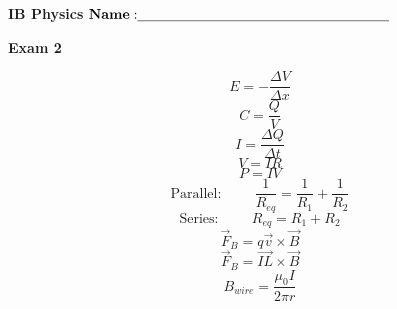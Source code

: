 \documentclass{article}
\begin{document}

\doublespacing
\textbf{IB Physics }                        %
 \hfill                             %
${\bf Name: } \underline{\hspace{2.5in}}$

\begin{centering}
\vspace{1cm}
\textbf{Exam 2}\\
\end{centering}

\vspace{1cm}
$$E=-\frac{\Delta V}{\Delta x}$$
$$C=\frac{Q}{V}$$
$$I=\frac{\Delta Q}{\Delta t}$$
   $$V=IR$$
   $$P=IV$$
   $$\text{Parallel:}\hspace{1cm} \frac{1}{R_{eq}}=\frac{1}{R_1}+\frac{1}{R_2}$$
   $$\text{Series:}\hspace{1cm} {R_{eq}}={R_1}+{R_2}$$
   $$\overrightarrow{F}_B=q\overrightarrow{v}\times\overrightarrow{B}$$
    $$\overrightarrow{F}_B=\overrightarrow{IL}\times\overrightarrow{B}$$
    $$B_{wire}=\frac{\mu_0 I}{2\pi r}$$
\end{document}
